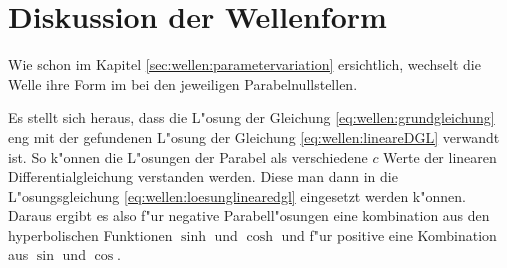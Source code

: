 \section{Diskussion der Wellenform}
\label{sec:wellen:diskussionwellenform}

Wie schon im Kapitel \ref{sec:wellen:parametervariation} ersichtlich, 
wechselt die Welle ihre Form im bei den jeweiligen Parabelnullstellen.

Es stellt sich heraus, dass die L"osung der Gleichung 
\ref{eq:wellen:grundgleichung} eng mit der gefundenen L"osung der Gleichung 
\ref{eq:wellen:lineareDGL} verwandt ist. So k"onnen die L"osungen der Parabel 
als verschiedene $c$ Werte der linearen Differentialgleichung verstanden 
werden. Diese man dann in die L"osungsgleichung 
\ref{eq:wellen:loesunglinearedgl} eingesetzt werden k"onnen. Daraus ergibt es 
also f"ur negative Parabell"osungen eine kombination aus den hyperbolischen 
Funktionen $\sinh$ und $\cosh$ und f"ur positive eine Kombination aus $\sin$ 
und $\cos$.
